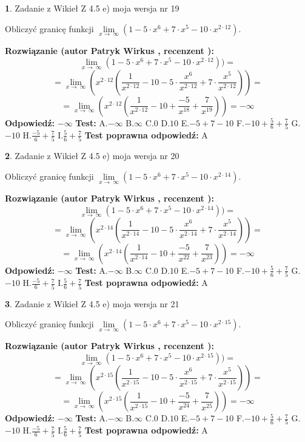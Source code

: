 \documentclass[12pt, a4paper]{article}
\theoremstyle{definition} %
\newtheorem{zad}{}
\newcommand{\zadStart}[1]{\begin{zad}#1\newline}
\newcommand{\zadStop}{\end{zad}}
\newcommand{\rozwStart}[2]{\noindent \textbf{Rozwiązanie (autor #1 , recenzent #2): }\newline}
\newcommand{\rozwStop}{\newline}
\newcommand{\odpStart}{\noindent \textbf{Odpowiedź:}\newline}
\newcommand{\odpStop}{\newline}
\newcommand{\testStart}{\noindent \textbf{Test:}\newline}
\newcommand{\testStop}{\newline}
\newcommand{\kluczStart}{\noindent \textbf{Test poprawna odpowiedź:}\newline}
\newcommand{\kluczStop}{\newline}
\begin{document}
\zadStart{Zadanie z Wikieł Z 4.5 e) moja wersja nr 19}



Obliczyć granicę funkcji  $\lim\limits_{x\to\ \infty}(1 - 5 \cdot x^{6}+7 \cdot x^{5}- 10 \cdot x^{2\cdot12})$.
\zadStop
\rozwStart{Patryk Wirkus}{}
$$\lim\limits_{x\to\ \infty}(1 - 5 \cdot x^{6}+7 \cdot x^{5}- 10 \cdot x^{2\cdot12}))=$$
$$=\lim\limits_{x\to\ \infty}(x^{2\cdot12}(\frac{1}{x^{2\cdot12}}-10 -5 \cdot \frac{x^{6}}{x^{2\cdot12}}+7 \cdot \frac{x^{5}}{x^{2\cdot12}}))=$$
$$=\lim\limits_{x\to\ \infty}(x^{2\cdot12}(\frac{1}{x^{2\cdot12}}-10 + \frac{-5}{x^{18}}+ \frac{7}{x^{19}}))=-\infty$$
\rozwStop
\odpStart
$-\infty$
\odpStop
\testStart
A.$-\infty$ B.$\infty$ C.$0$ D.$10$ E.$-5 + 7 - 10$
F.$-10+\frac{5}{6}+\frac{7}{5}$ G.$-10$
H.$\frac{-5}{6}+\frac{7}{5}$
I.$\frac{5}{6}+\frac{7}{5}$
\testStop
\kluczStart
A
\kluczStop



\zadStart{Zadanie z Wikieł Z 4.5 e) moja wersja nr 20}



Obliczyć granicę funkcji  $\lim\limits_{x\to\ \infty}(1 - 5 \cdot x^{6}+7 \cdot x^{5}- 10 \cdot x^{2\cdot14})$.
\zadStop
\rozwStart{Patryk Wirkus}{}
$$\lim\limits_{x\to\ \infty}(1 - 5 \cdot x^{6}+7 \cdot x^{5}- 10 \cdot x^{2\cdot14}))=$$
$$=\lim\limits_{x\to\ \infty}(x^{2\cdot14}(\frac{1}{x^{2\cdot14}}-10 -5 \cdot \frac{x^{6}}{x^{2\cdot14}}+7 \cdot \frac{x^{5}}{x^{2\cdot14}}))=$$
$$=\lim\limits_{x\to\ \infty}(x^{2\cdot14}(\frac{1}{x^{2\cdot14}}-10 + \frac{-5}{x^{22}}+ \frac{7}{x^{23}}))=-\infty$$
\rozwStop
\odpStart
$-\infty$
\odpStop
\testStart
A.$-\infty$ B.$\infty$ C.$0$ D.$10$ E.$-5 + 7 - 10$
F.$-10+\frac{5}{6}+\frac{7}{5}$ G.$-10$
H.$\frac{-5}{6}+\frac{7}{5}$
I.$\frac{5}{6}+\frac{7}{5}$
\testStop
\kluczStart
A
\kluczStop



\zadStart{Zadanie z Wikieł Z 4.5 e) moja wersja nr 21}



Obliczyć granicę funkcji  $\lim\limits_{x\to\ \infty}(1 - 5 \cdot x^{6}+7 \cdot x^{5}- 10 \cdot x^{2\cdot15})$.
\zadStop
\rozwStart{Patryk Wirkus}{}
$$\lim\limits_{x\to\ \infty}(1 - 5 \cdot x^{6}+7 \cdot x^{5}- 10 \cdot x^{2\cdot15}))=$$
$$=\lim\limits_{x\to\ \infty}(x^{2\cdot15}(\frac{1}{x^{2\cdot15}}-10 -5 \cdot \frac{x^{6}}{x^{2\cdot15}}+7 \cdot \frac{x^{5}}{x^{2\cdot15}}))=$$
$$=\lim\limits_{x\to\ \infty}(x^{2\cdot15}(\frac{1}{x^{2\cdot15}}-10 + \frac{-5}{x^{24}}+ \frac{7}{x^{25}}))=-\infty$$
\rozwStop
\odpStart
$-\infty$
\odpStop
\testStart
A.$-\infty$ B.$\infty$ C.$0$ D.$10$ E.$-5 + 7 - 10$
F.$-10+\frac{5}{6}+\frac{7}{5}$ G.$-10$
H.$\frac{-5}{6}+\frac{7}{5}$
I.$\frac{5}{6}+\frac{7}{5}$
\testStop
\kluczStart
A
\kluczStop
\end{document}
